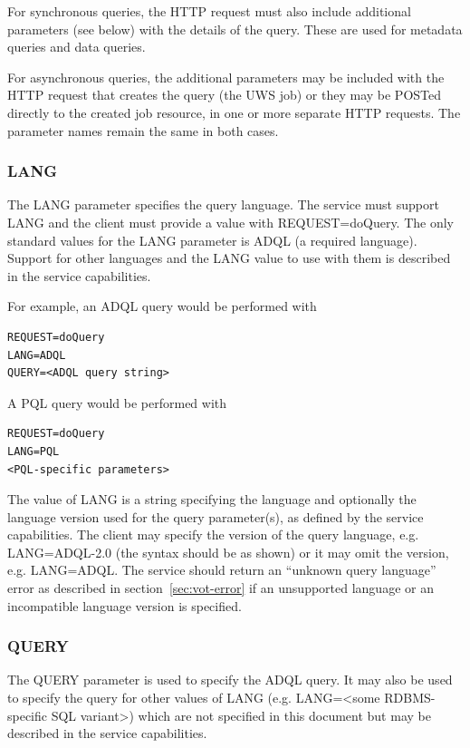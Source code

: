 \documentclass[11pt,letter]{ivoa}
\begin{document}
For synchronous queries, the HTTP request must also include additional 
parameters (see below) with the details of the query. These are used for 
metadata queries and data queries.

For asynchronous queries, the additional parameters may be included with the 
HTTP request that creates the query (the UWS job) or they may be POSTed directly 
to the created job resource, in one or more separate HTTP requests. The 
parameter names remain the same in both cases.

\subsubsection{LANG}
\label{sec:LANG}

The LANG parameter specifies the query language. The service must support LANG 
and the client must provide a value with REQUEST=doQuery. The only standard 
values for the LANG parameter is ADQL (a required language). Support for other 
languages and the LANG value to use with them is described in the service 
capabilities.

For example, an ADQL query would be performed with
\begin{verbatim}
REQUEST=doQuery
LANG=ADQL
QUERY=<ADQL query string>
\end{verbatim}
A PQL query would be performed with
\begin{verbatim}
REQUEST=doQuery
LANG=PQL
<PQL-specific parameters>
\end{verbatim}
The value of LANG is a string specifying the language and optionally the 
language version used for the query parameter(s), as defined by the service 
capabilities.  The client may specify the version of the query language,  e.g. 
LANG=ADQL-2.0 (the syntax should be as shown) or it may omit the version, e.g. 
LANG=ADQL.  The service should return an “unknown query language” error as 
described in section~\ref{sec:vot-error} if an unsupported language or an incompatible 
language version is specified.

\subsubsection{QUERY}
\label{sec:QUERY}

The QUERY parameter is used to specify the ADQL query. It may also be used to 
specify the query for other values of LANG (e.g. LANG=<some RDBMS-specific SQL 
variant>) which are not specified in this document but may be described in the 
service capabilities.
\end{document}
